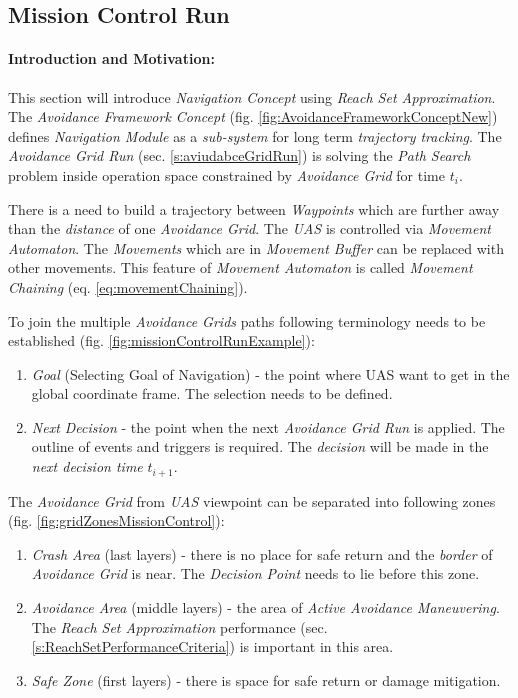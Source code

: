 \newpage
\subsection{Mission Control Run}\label{s:missionControlRun}
\paragraph{Introduction and Motivation:}  This section will introduce \emph{Navigation Concept} using  \emph{Reach Set Approximation}. The \emph{Avoidance Framework Concept} (fig. \ref{fig:AvoidanceFrameworkConceptNew}) defines \emph{Navigation Module} as a \emph{sub-system} for long term \emph{trajectory tracking}.  The \emph{Avoidance Grid Run} (sec. \ref{s:aviudabceGridRun}) is solving the \emph{Path Search} problem inside operation space constrained by \emph{Avoidance Grid} for time $t_i$. 

There is a need to build a trajectory between \emph{Waypoints} which are further away than the \emph{distance} of one \emph{Avoidance Grid}.  The \emph{UAS} is controlled via \emph{Movement Automaton}. The \emph{Movements} which are in \emph{Movement Buffer} can be replaced with other movements. This feature of \emph{Movement Automaton} is called \emph{Movement Chaining} (eq. \ref{eq:movementChaining}).

To join the multiple \emph{Avoidance Grids} paths following terminology needs to be established (fig. \ref{fig:missionControlRunExample}):
\begin{enumerate}
    \item \emph{Goal} (Selecting Goal of Navigation) - the point where UAS want to get in the global coordinate frame. The selection needs to be defined.
    
    \item \emph{Next Decision} - the point when the next \emph{Avoidance Grid Run} is applied. The outline of events and triggers is required. The \emph{decision} will be made in the \emph{next decision time} $t_{i+1}$.
\end{enumerate}

\noindent The \emph{Avoidance Grid} from \emph{UAS} viewpoint can be separated into following zones (fig. \ref{fig:gridZonesMissionControl}):
\begin{enumerate}
    \item \emph{Crash Area} (last layers) - there is no place for safe return and the \emph{border} of \emph{Avoidance Grid} is near. The \emph{Decision Point} needs to lie before this zone.
    
    \item \emph{Avoidance Area} (middle layers) - the area of \emph{Active Avoidance Maneuvering}. The \emph{Reach Set Approximation} performance (sec. \ref{s:ReachSetPerformanceCriteria}) is important in this area.
    
    \item \emph{Safe Zone} (first layers) - there is space for safe return or damage mitigation.
\end{enumerate}

